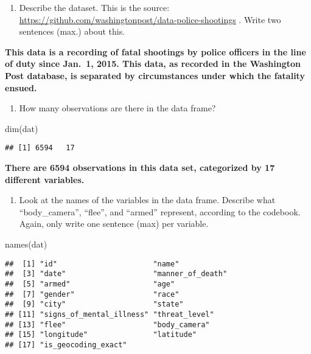 \documentclass[
]{article}
\newenvironment{Shaded}{\begin{snugshade}}{\end{snugshade}}
\newcommand{\FunctionTok}[1]{\textcolor[rgb]{0.00,0.00,0.00}{#1}}
\newcommand{\NormalTok}[1]{#1}
\providecommand{\tightlist}{%
  \setlength{\itemsep}{0pt}\setlength{\parskip}{0pt}}
\begin{document}
\begin{enumerate}
\def\labelenumi{\alph{enumi}.}
\tightlist
\item
  Describe the dataset. This is the source:
  \url{https://github.com/washingtonpost/data-police-shootings} . Write
  two sentences (max.) about this.
\end{enumerate}

\textbf{This data is a recording of fatal shootings by police officers
in the line of duty since Jan.~1, 2015. This data, as recorded in the
Washington Post database, is separated by circumstances under which the
fatality ensued.}

\begin{enumerate}
\def\labelenumi{\alph{enumi}.}
\setcounter{enumi}{1}
\tightlist
\item
  How many observations are there in the data frame?
\end{enumerate}

\begin{Shaded}
\begin{Highlighting}[]
\FunctionTok{dim}\NormalTok{(dat)}
\end{Highlighting}
\end{Shaded}

\begin{verbatim}
## [1] 6594   17
\end{verbatim}

\textbf{There are 6594 observations in this data set, categorized by 17
different variables.}

\begin{enumerate}
\def\labelenumi{\alph{enumi}.}
\setcounter{enumi}{2}
\tightlist
\item
  Look at the names of the variables in the data frame. Describe what
  ``body\_camera'', ``flee'', and ``armed'' represent, according to the
  codebook. Again, only write one sentence (max) per variable.
\end{enumerate}

\begin{Shaded}
\begin{Highlighting}[]
\FunctionTok{names}\NormalTok{(dat)}
\end{Highlighting}
\end{Shaded}

\begin{verbatim}
##  [1] "id"                      "name"                   
##  [3] "date"                    "manner_of_death"        
##  [5] "armed"                   "age"                    
##  [7] "gender"                  "race"                   
##  [9] "city"                    "state"                  
## [11] "signs_of_mental_illness" "threat_level"           
## [13] "flee"                    "body_camera"            
## [15] "longitude"               "latitude"               
## [17] "is_geocoding_exact"
\end{verbatim}
\end{document}
